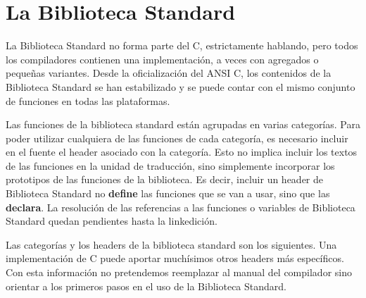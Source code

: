 



\chapter{La Biblioteca Standard}
La Biblioteca Standard no forma parte del C, estrictamente hablando, pero todos
los compiladores contienen una implementación, a veces con agregados o pequeñas
variantes. Desde la oficialización del ANSI C, los contenidos de la Biblioteca
Standard se han estabilizado y se puede contar con el mismo conjunto de
funciones en todas las plataformas.

Las funciones de la biblioteca standard están agrupadas en varias categorías.
Para poder utilizar cualquiera de las funciones de cada categoría, es necesario
incluir en el fuente el header asociado con la categoría. Esto no
implica incluir los textos de las funciones en la unidad de traducción, sino
simplemente incorporar los prototipos de las funciones de la biblioteca. Es
decir, incluir un header de Biblioteca Standard no \textbf{define} las funciones que se
van a usar, sino que las \textbf{declara}. La resolución de las referencias a las
funciones o variables de Biblioteca Standard quedan pendientes hasta la
linkedición.

Las categorías y los headers de la biblioteca standard son los siguientes. Una
implementación de C puede aportar muchísimos otros headers más específicos. Con
esta información no pretendemos reemplazar al manual del compilador sino
orientar a los primeros pasos en el uso de la Biblioteca Standard.



